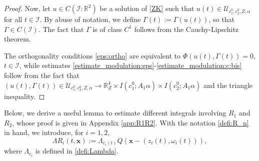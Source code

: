 \documentclass[reqno,10pt]{amsart}
\numberwithin{equation}{section}
\newcommand{\bx}{\mathbf{x}}
\begin{document}
\begin{proof}
		Now, let $u \in C(\mathcal{I}:\mathbb R^2)$ be a solution of \eqref{ZK} such that $u(t) \in \mathcal{U}_{c_1^0, c_2^0, Z, \alpha}$ for all $t \in \mathcal{I}$. By abuse of notation, we define $\Gamma(t):=\Gamma(u(t))$, so that $\Gamma \in C(\mathcal{I})$. The fact that $\Gamma$ is of class $C^1$ follows from the Cauchy-Lipschitz theorem. 
		
		The orthogonality conditions \eqref{eps:ortho} are equivalent to $\Phi(u(t),\Gamma(t))=0$, $t \in \mathcal{I}$, while estimates \eqref{estimate_modulation:eps}-\eqref{estimate_modulation:c:bis} follow from the fact that $(u(t),\Gamma(t)) \in \mathcal{U}_{c_1^0, c_2^0, Z, \alpha}  \to \mathbb R^4_Z \times I(c_1^0;A_1 \alpha) \times I(c_2^0;A_1 \alpha)$ and the triangle inequality.
	\end{proof}

	
 
	Below, we derive a useful lemma to estimate different integrals involving $R_1$ and $R_2$, whose proof is given in Appendix \ref{app:R1R2}. With the notation \eqref{defi:R_n} in hand, we introduce, for $i=1,2$,
	\begin{equation} \label{def:LambdaRi}
		\Lambda R_i(t,\bx):=\Lambda_{c_i(t)}Q(\bx-(z_i(t),\omega_i(t))),
	\end{equation}
	where $\Lambda_{c_i}$ is defined in \eqref{defi:Lambda}.
	
\end{document}
